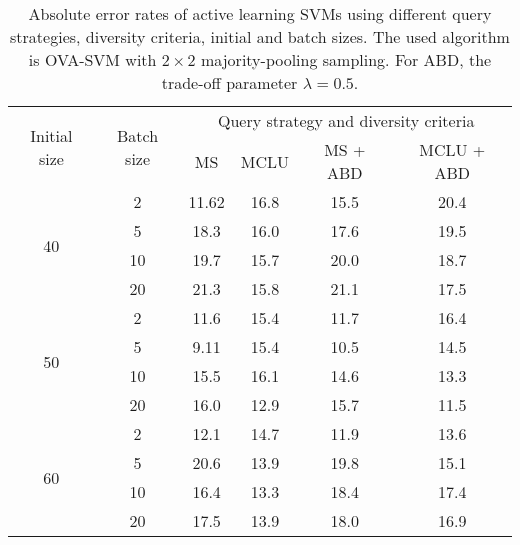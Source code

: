 \begin{table}[ht!]
\centering
\caption{Absolute error rates of active learning SVMs using different query strategies, diversity criteria, initial and batch sizes. The used algorithm is OVA-SVM with  $2 \times 2$ majority-pooling sampling. For ABD, the trade-off parameter  $\lambda = 0.5$. } 
\begin{threeparttable}
\begin{tabular}{ |c| c|c|c|c| c| }
\hline
\multirow{2}{*}{Initial size}  & \multirow{2}{*}{Batch size} &  \multicolumn{4}{c|}{Query strategy and diversity criteria} \\
                                           \cline{3-6}
                                            &                     &   MS    &    MCLU    &    MS + ABD  &  MCLU + ABD   \\
\hline
\multirow{4}{*}{40}             &    2              &  11.62   &  16.8        & 15.5             &  20.4              \\ 
 \cline{2-6}
                                            &    5               &  18.3   & 16.0         & 17.6               &  19.5                      \\
\cline{2-6}
                                            &    10              &  19.7    & 15.7       &  20.0               &  18.7                           \\
\cline{2-6}
                                            &    20               & 21.3   & 15.8        & 21.1                &  17.5 \\
\hline

\multirow{4}{*}{50}             &    2              &  11.6     & 15.4       & 11.7                &  16.4                  \\ 
 \cline{2-6}
                                            &    5               &  9.11    &  15.4      & 10.5                & 14.5            \\
\cline{2-6}
                                            &    10             & 15.5     &  16.1       & 14.6               & 13.3\\
\cline{2-6}
                                            &    20             & 16.0     & 12.9        & 15.7              & 11.5\\
\hline

\multirow{4}{*}{60}             &    2              &12.1         & 14.7     &  11.9              &  13.6                  \\ 
 \cline{2-6}
                                            &    5               & 20.6        & 13.9     &  19.8              & 15.1\\
\cline{2-6}
                                            &    10             & 16.4        & 13.3      & 18.4               & 17.4\\
\cline{2-6}
                                            &    20             & 17.5         & 13.9      & 18.0               & 16.9 \\
\hline


\end{tabular}
\end{threeparttable}
\end{table}
